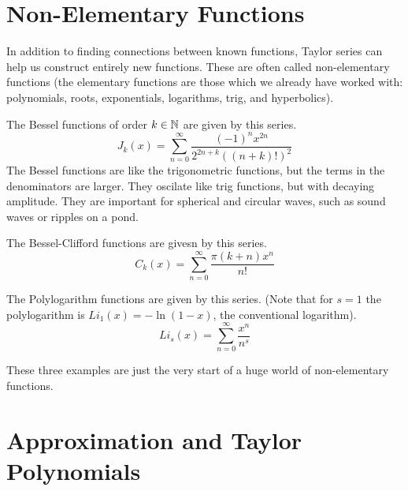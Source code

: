 \documentclass[fleqn,letterpaper]{report}
\begin{document}
\section{Non-Elementary Functions}
\label{non-elementary-functions}

In addition to finding connections between known functions,
Taylor series can help us construct entirely new functions.
These are often called non-elementary functions (the
elementary functions are those which we already have worked
with: polynomials, roots, exponentials, logarithms, trig, and 
hyperbolics). 

\begin{example}
The Bessel functions of order $k \in \mathbb{N}$ are given by this
series.
\begin{equation*}
J_k(x) = \sum_{n=0}^\infty \frac{(-1)^n x^{2n}}{2^{2n+k}
((n+k)!)^2}
\end{equation*}
The Bessel functions are like the trigonometric functions, but the
terms in the denominators are larger. They oscilate like trig
functions, but with decaying amplitude. They are important
for spherical and circular waves, such as sound waves or
ripples on a pond.
\end{example}

\begin{example}
The Bessel-Clifford functions are givesn by this series.
\begin{equation*}
C_k(x) = \sum_{n=0}^\infty \frac{\pi (k+n) x^n}{n!}
\end{equation*}
\end{example}

\begin{example}
The Polylogarithm functions are given by this series.
(Note that for $s=1$ the polylogarithm is $Li_1(x) =
-\ln (1-x)$, the conventional logarithm).
\begin{equation*}
Li_s(x) = \sum_{n=0}^\infty \frac{x^{n}}{n^s}
\end{equation*}
\end{example}

These three examples are just the very start of a huge world
of non-elementary functions.

\section{Approximation and Taylor Polynomials}
\label{approximation}
\end{document}
